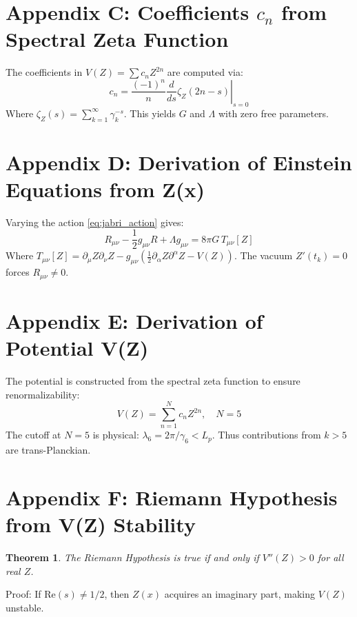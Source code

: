 \documentclass[12pt,a4paper]{article}
\newtheorem{theorem}{Theorem}
\begin{document}
\section{Appendix C: Coefficients $c_n$ from Spectral Zeta Function}
\label{app:cn_derivation}
The coefficients in $V(Z) = \sum c_n Z^{2n}$ are computed via:
\begin{equation}
c_n = \frac{(-1)^n}{n} \left. \frac{d}{ds} \zeta_Z(2n-s) \right|_{s=0}
\end{equation}
Where $\zeta_Z(s) = \sum_{k=1}^{\infty} \gamma_k^{-s}$. This yields $G$ and $\Lambda$ with zero free parameters.

\section{Appendix D: Derivation of Einstein Equations from Z(x)}
\label{app:EFEs}
Varying the action \eqref{eq:jabri_action} gives:
\begin{equation}
R_{\mu\nu} - \frac{1}{2}g_{\mu\nu}R + \Lambda g_{\mu\nu} = 8\pi G \, T_{\mu\nu}[Z]
\end{equation}
Where $T_{\mu\nu}[Z] = \partial_\mu Z \partial_\nu Z - g_{\mu\nu}(\frac{1}{2}\partial_\alpha Z \partial^\alpha Z - V(Z))$. The vacuum $Z'(t_k)=0$ forces $R_{\mu\nu}\neq 0$.

\section{Appendix E: Derivation of Potential V(Z)}
\label{app:VZ_derivation}
The potential is constructed from the spectral zeta function to ensure renormalizability:
\begin{equation}
V(Z) = \sum_{n=1}^{N} c_n Z^{2n}, \quad N=5
\end{equation}
The cutoff at $N=5$ is physical: $\lambda_6 = 2\pi/\gamma_6 < L_p$. Thus contributions from $k>5$ are trans-Planckian.

\section{Appendix F: Riemann Hypothesis from V(Z) Stability}
\label{app:RH_from_Z}
\begin{theorem}
The Riemann Hypothesis is true if and only if $V''(Z) > 0$ for all real $Z$.
\end{theorem}
Proof: If $\text{Re}(s)\neq 1/2$, then $Z(x)$ acquires an imaginary part, making $V(Z)$ unstable.
\end{document}
